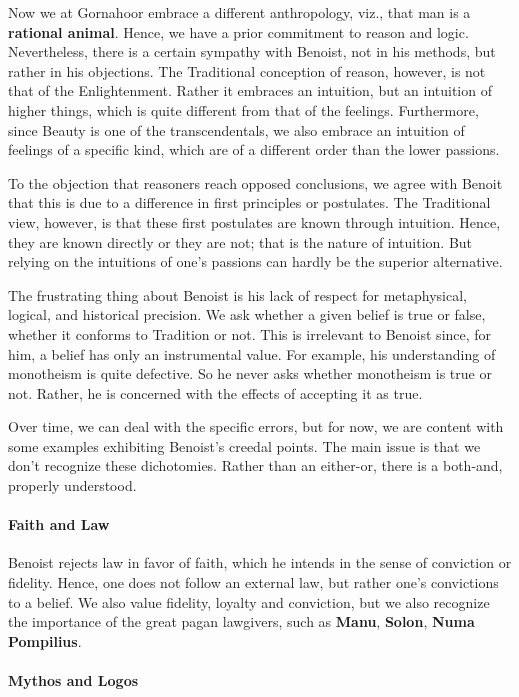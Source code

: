 Now we at Gornahoor embrace a different anthropology, viz., that man is a \textbf{rational animal}. Hence, we have a prior commitment to reason and logic. Nevertheless, there is a certain sympathy with Benoist, not in his methods, but rather in his objections. The Traditional conception of reason, however, is not that of the Enlightenment. Rather it embraces an intuition, but an intuition of higher things, which is quite different from that of the feelings. Furthermore, since Beauty is one of the transcendentals, we also embrace an intuition of feelings of a specific kind, which are of a different order than the lower passions.

To the objection that reasoners reach opposed conclusions, we agree with Benoit that this is due to a difference in first principles or postulates. The Traditional view, however, is that these first postulates are known through intuition. Hence, they are known directly or they are not; that is the nature of intuition. But relying on the intuitions of one's passions can hardly be the superior alternative.

The frustrating thing about Benoist is his lack of respect for metaphysical, logical, and historical precision. We ask whether a given belief is true or false, whether it conforms to Tradition or not. This is irrelevant to Benoist since, for him, a belief has only an instrumental value. For example, his understanding of monotheism is quite defective. So he never asks whether monotheism is true or not. Rather, he is concerned with the effects of accepting it as true.

Over time, we can deal with the specific errors, but for now, we are content with some examples exhibiting Benoist's creedal points. The main issue is that we don't recognize these dichotomies. Rather than an either-or, there is a both-and, properly understood.


\paragraph{Faith and Law}


Benoist rejects law in favor of faith, which he intends in the sense of conviction or fidelity. Hence, one does not follow an external law, but rather one's convictions to a belief. We also value fidelity, loyalty and conviction, but we also recognize the importance of the great pagan lawgivers, such as \textbf{Manu}, \textbf{Solon}, \textbf{Numa Pompilius}.

\paragraph{Mythos and Logos}


